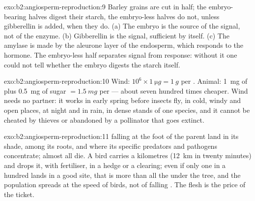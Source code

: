 \begin{solution}{exo:b2:angiosperm-reproduction:9}
Barley grains are cut in half; the embryo-bearing halves digest
their starch, the embryo-less halves do not, unless gibberellin is
added, when they do. (a) The embryo is the source of the signal, not
of the enzyme. (b) Gibberellin is the signal, sufficient by itself.
(c) The amylase is made by the aleurone layer of the endosperm,
which responds to the hormone. The embryo-less half separates signal
from response: without it one could not tell whether the embryo
digests the starch itself.
\end{solution}

\begin{solution}{exo:b2:angiosperm-reproduction:10}
Wind: $10^{6}\times\qty{1}{\micro g} = \qty{1}{g}$ per . Animal:
\qty{1}{mg} of  plus \qty{0.5}{mg} of sugar $= \qty{1.5}{mg}$
per  --- about seven hundred times cheaper. Wind 
needs no partner: it works in early spring before insects fly, in
cold, windy and open places, at night and in rain, in dense stands
of one species, and it cannot be cheated by  thieves or
abandoned by a pollinator that goes extinct.
\end{solution}

\begin{solution}{exo:b2:angiosperm-reproduction:11}
 falling at the foot of the parent land in its shade, among its
roots, and where its specific  predators and pathogens
concentrate; almost all die. A bird carries a  kilometres
(\qty{12}{km} in twenty minutes) and drops it, with fertiliser, in a
hedge or a clearing; even if only one  in a hundred lands in a
good site, that is more than all the  under the tree, and the
population spreads at the speed of birds, not of falling . The
flesh is the price of the ticket.
\end{solution}


